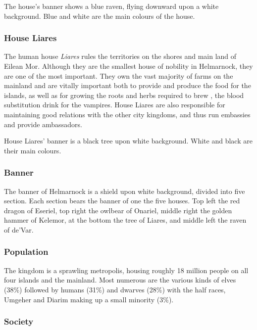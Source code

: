 The house's banner shows a blue raven, flying downward upon a white
background.  Blue and white are the main colours of the house.

\subsubsection{House Liares}
\label{sec:House Liares}

The human house \emph{Liares} rules the territories on the shores and main
land of Eilean Mor. Although they are the smallest house of nobility in
Helmarnock, they are one of the most important. They own the vast majority of
farms on the mainland and are vitally important both to provide and produce
the food for the islands, as well as for growing the roots and herbs required
to brew , the blood substitution drink for the
vampires. House Liares are also responsible for maintaining good relations
with the other city kingdoms, and thus run embassies and provide ambassadors.

House Liares' banner is a black tree upon white background. White and black
are their main colours.

\subsubsection{Banner}

The banner of Helmarnock is a shield upon white background, divided into five
section. Each section bears the banner of one the five houses. Top left the
red dragon of Eseriel, top right the owlbear of Onariel, middle right the
golden hammer of Kelemor, at the bottom the tree of Liares, and middle left
the raven of de'Var.

\subsubsection{Population}

The kingdom is a sprawling metropolis, housing roughly 18 million people on
all four islands and the mainland. Most numerous are the various kinds of
elves (38\%) followed by humans (31\%) and dwarves (28\%) with the half
races, Umgeher and Diarim making up a small minority (3\%).

\subsubsection{Society}

